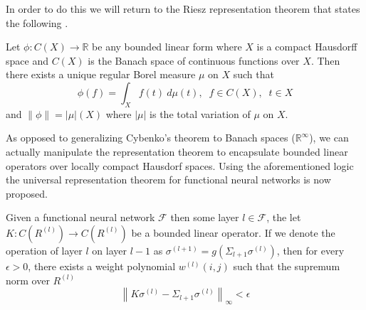 In order to do this we will return to the Riesz representation theorem that states the following \cite{revisited}. 
\begin{theorem}
Let $\phi:C(X) \to \mathbb{R}$ be any bounded linear form where $X$ is a compact Hausdorff space and $C(X)$ is the Banach space of continuous functions over $X$. Then there exists a unique regular Borel measure $\mu$ on $X$ such that
\begin{equation}\phi(f) =\int_X f(t)\  d\mu(t),\; \; f\in C(X), \; \; t\in X\end{equation} and $\|\phi\| = |\mu|(X)$ where $|\mu|$ is the total variation of $\mu$ on $X$. 
\end{theorem}
As opposed to generalizing Cybenko's theorem to Banach spaces ($\mathbb{R}^\infty$), we can actually manipulate the representation theorem to encapsulate bounded linear operators over locally compact Hausdorf spaces. Using the aforementioned logic the universal representation theorem for functional neural networks is now proposed.
\begin{theorem}
Given a functional neural network $\mathcal{F}$ then some layer $l \in \mathcal{F}$, the let $K:C(R^{(l)})\to C(R^{(l)})$ be a bounded linear operator. If we denote the operation of layer $l$ on layer $l-1$ as $\sigma^{(l+1)} = g\left(\Sigma_{l+1}\sigma^{(l)}\right)$, then for every $\epsilon >0$, there exists a weight polynomial $w^{(l)}(i,j)$ such that the supremum norm over $R^{(l)}$ \begin{equation}\left\|K\sigma^{(l)} -\Sigma_{l+1}\sigma^{(l)}\right\|_{\infty} < \epsilon\end{equation}

\end{theorem}
